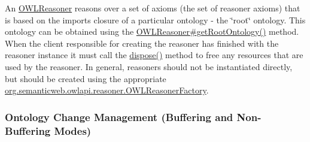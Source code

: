 An \hyperlink{interfaceorg_1_1semanticweb_1_1owlapi_1_1reasoner_1_1_o_w_l_reasoner}{O\-W\-L\-Reasoner} reasons over a set of axioms (the set of reasoner axioms) that is based on the imports closure of a particular ontology -\/ the \char`\"{}root\char`\"{} ontology. This ontology can be obtained using the \hyperlink{interfaceorg_1_1semanticweb_1_1owlapi_1_1reasoner_1_1_o_w_l_reasoner_a4b37e37c20004f092407b47ad74cab11}{O\-W\-L\-Reasoner\#get\-Root\-Ontology()} method. When the client responsible for creating the reasoner has finished with the reasoner instance it must call the \hyperlink{interfaceorg_1_1semanticweb_1_1owlapi_1_1reasoner_1_1_o_w_l_reasoner_abb6136592255c0e212ecefd3c0615c80}{dispose()} method to free any resources that are used by the reasoner. In general, reasoners should not be instantiated directly, but should be created using the appropriate \hyperlink{interfaceorg_1_1semanticweb_1_1owlapi_1_1reasoner_1_1_o_w_l_reasoner_factory}{org.\-semanticweb.\-owlapi.\-reasoner.\-O\-W\-L\-Reasoner\-Factory}. 

\subsubsection*{Ontology Change Management (Buffering and Non-\/\-Buffering Modes)}

